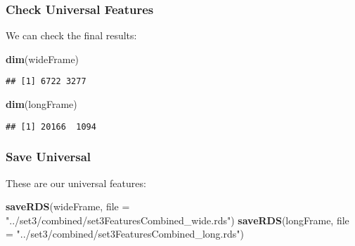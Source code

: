 \documentclass[10pt]{report}
\newenvironment{Shaded}{}{}
\newcommand{\KeywordTok}[1]{\textcolor[rgb]{0.00,0.44,0.13}{\textbf{{#1}}}}
\newcommand{\DataTypeTok}[1]{\textcolor[rgb]{0.56,0.13,0.00}{{#1}}}
\newcommand{\DecValTok}[1]{\textcolor[rgb]{0.25,0.63,0.44}{{#1}}}
\newcommand{\StringTok}[1]{\textcolor[rgb]{0.25,0.44,0.63}{{#1}}}
\newcommand{\NormalTok}[1]{{#1}}
\begin{document}
\begin{Shaded}
\end{Shaded}

\subsubsection{Check Universal
Features}\label{check-universal-features-3}

We can check the final results:

\begin{Shaded}
\begin{Highlighting}[]
\KeywordTok{dim}\NormalTok{(wideFrame)}
\end{Highlighting}
\end{Shaded}

\begin{verbatim}
## [1] 6722 3277
\end{verbatim}

\begin{Shaded}
\begin{Highlighting}[]
\KeywordTok{dim}\NormalTok{(longFrame)}
\end{Highlighting}
\end{Shaded}

\begin{verbatim}
## [1] 20166  1094
\end{verbatim}

\subsubsection{Save Universal}\label{save-universal-3}

These are our universal features:

\begin{Shaded}
\begin{Highlighting}[]
\KeywordTok{saveRDS}\NormalTok{(wideFrame, }\DataTypeTok{file =} \StringTok{"../set3/combined/set3FeaturesCombined_wide.rds"}\NormalTok{)}
\KeywordTok{saveRDS}\NormalTok{(longFrame, }\DataTypeTok{file =} \StringTok{"../set3/combined/set3FeaturesCombined_long.rds"}\NormalTok{)}
\end{Highlighting}
\end{Shaded}
\end{document}

